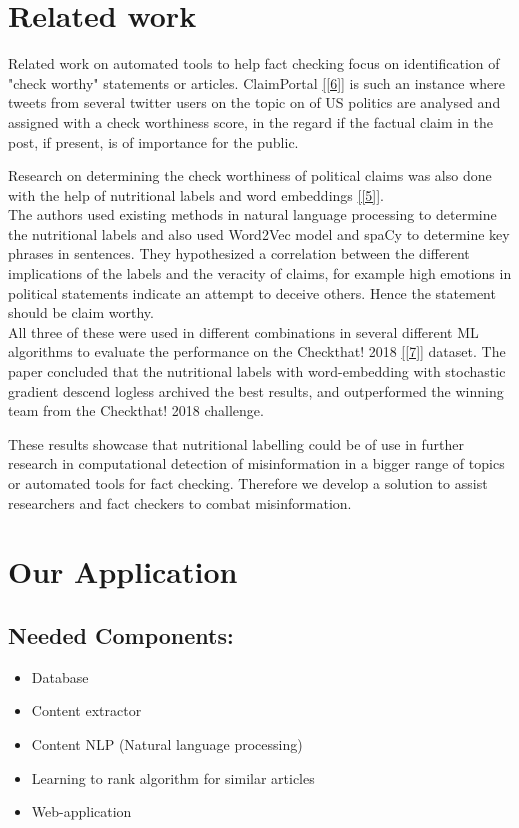 \documentclass[10pt]{article}
\begin{document}
\section{Related work}
Related work on automated tools to help fact checking focus on identification of "check worthy" statements or articles.
ClaimPortal \ref{[6]} is such an instance where tweets from several twitter users on the topic on of US politics are analysed and assigned with a check worthiness  score, in the regard if the factual claim in the post, if present, is of importance for the public.

Research on determining the check worthiness of political claims was also done with the help of nutritional labels and word embeddings \ref{[5]}.\\
The authors used existing methods in natural language processing to determine the nutritional labels and also used Word2Vec model and spaCy to determine key phrases in sentences.
They hypothesized a correlation between the different implications of the labels and the veracity of claims, for example high emotions in political statements indicate an attempt to deceive others. Hence the statement should be claim worthy. \\
All three of these were used in different combinations in several different ML algorithms to evaluate the performance on the Checkthat! 2018 \ref{[7]} dataset.
The paper concluded that the nutritional labels with word-embedding with stochastic gradient descend logless archived the best results, and outperformed the winning team from the Checkthat! 2018 challenge.

These results showcase that nutritional labelling could be of use in further research in computational detection of misinformation in a bigger range of topics or automated tools for fact checking.
Therefore we develop a solution to assist researchers and fact checkers to combat misinformation.

\section{Our Application}
\subsection{Needed Components:}
\begin{itemize}
\item Database
\item Content extractor
\item Content NLP (Natural language processing)
\item Learning to rank algorithm for similar articles
\item Web-application
\end{itemize}
\end{document}
